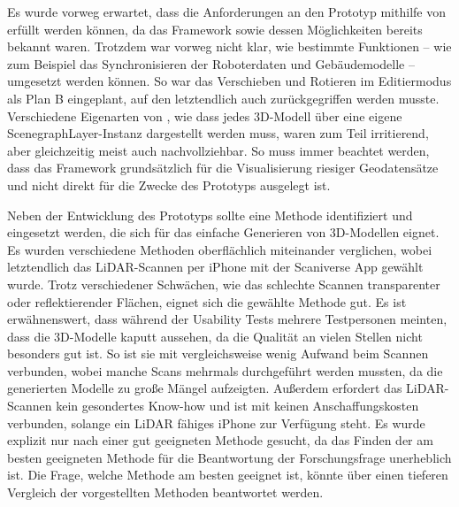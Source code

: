 Es wurde vorweg erwartet, dass die Anforderungen an den Prototyp mithilfe von \deckgl{} erfüllt werden können, da das Framework sowie dessen Möglichkeiten bereits bekannt waren. Trotzdem war vorweg nicht klar, wie bestimmte Funktionen – wie zum Beispiel das Synchronisieren der Roboterdaten und Gebäudemodelle – umgesetzt werden können. So war das Verschieben und Rotieren im Editiermodus als Plan B eingeplant, auf den letztendlich auch zurückgegriffen werden musste. Verschiedene Eigenarten von \deckgl{}, wie dass jedes 3D-Modell über eine eigene ScenegraphLayer-Instanz dargestellt werden muss, waren zum Teil irritierend, aber gleichzeitig meist auch nachvollziehbar. So muss immer beachtet werden, dass das Framework grundsätzlich für die Visualisierung riesiger Geodatensätze und nicht direkt für die Zwecke des Prototyps ausgelegt ist.

Neben der Entwicklung des Prototyps sollte eine Methode identifiziert und eingesetzt werden, die sich für das einfache Generieren von 3D-Modellen eignet. Es wurden verschiedene Methoden oberflächlich miteinander verglichen, wobei letztendlich das \ac{LiDAR}-Scannen per iPhone mit der Scaniverse App gewählt wurde. Trotz verschiedener Schwächen, wie das schlechte Scannen transparenter oder reflektierender Flächen, eignet sich die gewählte Methode gut. Es ist erwähnenswert, dass während der Usability Tests mehrere Testpersonen meinten, dass die 3D-Modelle kaputt aussehen, da die Qualität an vielen Stellen nicht besonders gut ist. So ist sie mit vergleichsweise wenig Aufwand beim Scannen verbunden, wobei manche Scans mehrmals durchgeführt werden mussten, da die generierten Modelle zu große Mängel aufzeigten. Außerdem erfordert das \ac{LiDAR}-Scannen kein gesondertes Know-how und ist mit keinen Anschaffungskosten verbunden, solange ein \ac{LiDAR} fähiges iPhone zur Verfügung steht. Es wurde explizit nur nach einer gut geeigneten Methode gesucht, da das Finden der am besten geeigneten Methode für die Beantwortung der Forschungsfrage unerheblich ist. Die Frage, welche Methode am besten geeignet ist, könnte über einen tieferen Vergleich der vorgestellten Methoden beantwortet werden.

